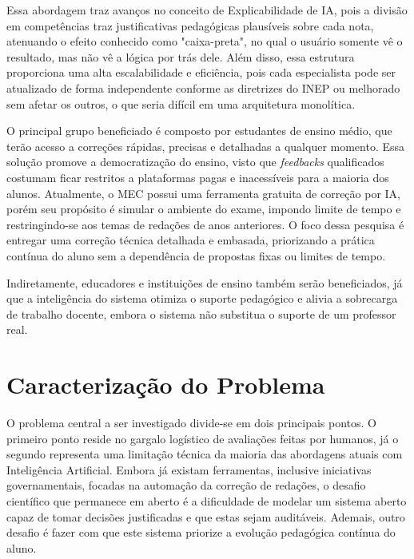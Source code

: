\documentclass[12pt]{article}
\begin{document}
Essa abordagem traz avanços no conceito de Explicabilidade de IA, pois a divisão em competências traz justificativas pedagógicas plausíveis sobre cada nota, atenuando o efeito conhecido como "caixa-preta", no qual o usuário somente vê o resultado, mas não vê a lógica por trás dele. Além disso, essa estrutura proporciona uma alta escalabilidade e eficiência, pois cada especialista pode ser atualizado de forma independente conforme as diretrizes do INEP ou melhorado sem afetar os outros, o que seria difícil em uma arquitetura monolítica.

O principal grupo beneficiado é composto por estudantes de ensino médio, que terão acesso a correções rápidas, precisas e detalhadas a qualquer momento. Essa solução promove a democratização do ensino, visto que \textit{feedbacks} qualificados costumam ficar restritos a plataformas pagas e inacessíveis para a maioria dos alunos. Atualmente, o MEC possui uma ferramenta gratuita de correção por IA, porém seu propósito é simular o ambiente do exame, impondo limite de tempo e restringindo-se aos temas de redações de anos anteriores. O foco dessa pesquisa é entregar uma correção técnica detalhada e embasada, priorizando a prática contínua do aluno sem a dependência de propostas fixas ou limites de tempo.

Indiretamente, educadores e instituições de ensino também serão beneficiados, já que a inteligência do sistema otimiza o suporte pedagógico e alivia a sobrecarga de trabalho docente, embora o sistema não substitua o suporte de um professor real.

\section{Caracterização do Problema}
\label{sec:problema}

O problema central a ser investigado divide-se em dois principais pontos. O primeiro ponto reside no gargalo logístico de avaliações feitas por humanos, já o segundo representa uma limitação técnica da maioria das abordagens atuais com Inteligência Artificial. Embora já existam ferramentas, inclusive iniciativas governamentais, focadas na automação da correção de redações, o desafio científico que permanece em aberto é a dificuldade de modelar um sistema aberto capaz de tomar decisões justificadas e que estas sejam auditáveis. Ademais, outro desafio é fazer com que este sistema priorize a evolução pedagógica contínua do aluno.
\end{document}
